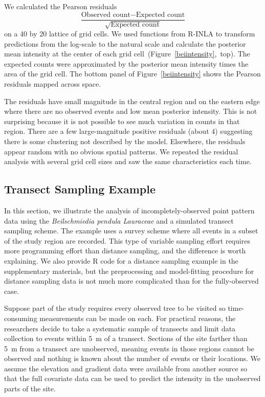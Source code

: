 \documentclass[]{interact}
\begin{document}
We calculated the Pearson residuals
\begin{equation}
\frac{\text{Observed count} - \text{Expected count}}
{\sqrt{\text{Expected count}}}
\end{equation}
on a 40 by 20 lattice of grid cells. We used functions from R-INLA to transform
predictions from the log-scale to the natural scale and calculate the posterior
mean intensity at the center of each grid
cell~(Figure~\ref{beiintensity},~top). The expected counts were approximated by the posterior mean intensity times the area of the grid cell. The bottom panel
of Figure~\ref{beiintensity} shows the Pearson residuals mapped across space.

The residuals have small magnitude in the central region and on the eastern
edge where there are no observed events and low mean posterior intensity. This
is not surprising because it is not possible to see much variation in counts
in that region. There are a few large-magnitude positive residuals (about 4)
suggesting there is some clustering not described by the model. Elsewhere, the
residuals appear random with no obvious spatial patterns. We repeated the
residual analysis with several grid cell sizes and saw the same characteristics
each time.


\subsection{Transect Sampling Example}
\label{xsectanalysis}

In this section, we illustrate the analysis of incompletely-observed point
pattern data using the \emph{Beilschmiedia pendula Lauraceae} and a simulated
transect sampling scheme. The example uses a survey scheme where all events in
a subset of the study region are recorded. This type of variable sampling
effort requires more programming effort than distance sampling, and the
difference is worth explaining. We also provide R code for a distance sampling
example in the supplementary materials, but the preprocessing and model-fitting
procedure for distance sampling data is not much more complicated than for the
fully-observed case.

Suppose part of the study requires every observed tree to be visited so
time-consuming measurements can be made on each. For practical reasons, the
researchers decide to take a systematic sample of transects and limit data
collection to events within 5~m of a transect. Sections of the site farther
than 5~m from a transect are unobserved, meaning events in those regions
cannot be observed and nothing is known about the number of events or their
locations. We assume the elevation and gradient data were available from
another source so that the full covariate data can be used to predict the
intensity in the unobserved parts of the site.
\end{document}
